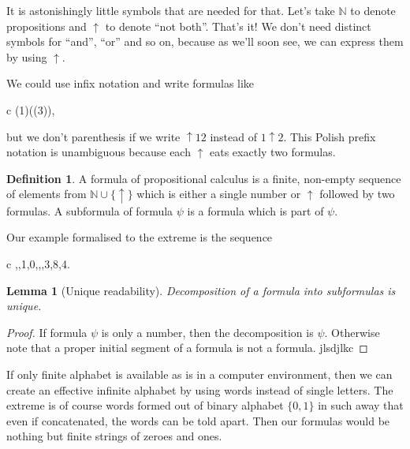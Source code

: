 \documentclass[11pt,oneside,%
]{memoir}
\newenvironment{eqna}{\begin{IEEEeqnarray}{c}}{\end{IEEEeqnarray}\ignorespacesafterend}
\newtheorem{lemma}{Lemma}
\theoremstyle{definition}
\newtheorem{maaritelma}{Definition}
\newcommand{\NN}{\mathbb{N}}
\begin{document}

It is astonishingly little symbols that are needed for that. Let's take \(\NN\) to denote propositions and \(\uparrow\) to denote ``not both''. That's it! We don't need distinct symbols for ``and'', ``or'' and so on, because as we'll soon see, we can express them by using \(\uparrow\).

We could use infix notation and write formulas like
\begin{eqna}
    (1)\uparrow((3)),
\end{eqna} 
but we don't parenthesis if we write \(\uparrow12\) instead of \(1\uparrow2\). This Polish prefix notation is unambiguous because each \(\uparrow\) eats exactly two formulas.%
\begin{maaritelma}
A formula of propositional calculus is a finite, non-empty sequence of elements from \(\NN\cup\lbrace\uparrow\rbrace\) which is either a single number or \(\uparrow\) followed by two formulas. A subformula of formula \(\psi\) is a formula which is part of \(\psi\).
\end{maaritelma}
Our example formalised to the extreme is the sequence
\begin{eqna}
    \uparrow,\uparrow,1,0,\uparrow,\uparrow,3,8,4.
\end{eqna}
\begin{lemma}[Unique readability]
Decomposition of a formula into subformulas is unique.
\end{lemma}
\begin{proof}
If formula \(\psi\) is only a number, then the decomposition is \(\psi\). Otherwise note that a proper initial segment of a formula is not a formula. jlsdjlkc
\end{proof}
If only finite alphabet is available as is in a computer environment, then we can create an effective infinite alphabet by using words instead of single letters. The extreme is of course words formed out of binary alphabet \(\lbrace0,1\rbrace\) in such away that even if concatenated, the words can be told apart. Then our formulas would be nothing but finite strings of zeroes and ones.
\end{document}
